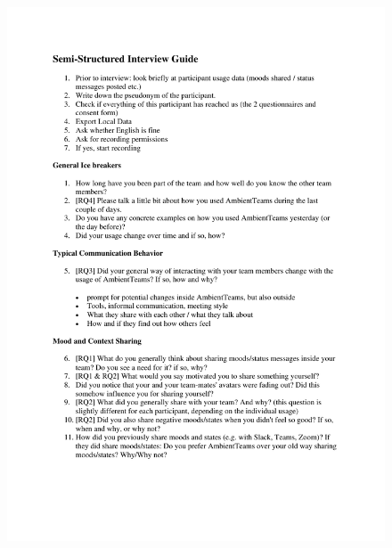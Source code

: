 \begin{figure}[h]
    \centering
    \includegraphics[width=\linewidth, page=3]{./documents/Semi-Structured Interview Guide.pdf}
\end{figure}